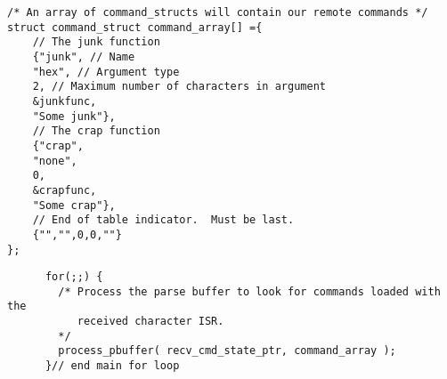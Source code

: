 \usepackage{listings}



\lstset{language=C}
\begin{lstlisting}[float, % Allows this listing to be a latex float
                   frame=single,
                   caption={Defining the command set with an array of
                            command structures.},
                   label=lst:cmdarray
                  ]
/* An array of command_structs will contain our remote commands */
struct command_struct command_array[] ={
    // The junk function
    {"junk", // Name
    "hex", // Argument type
    2, // Maximum number of characters in argument
    &junkfunc,
    "Some junk"},
    // The crap function
    {"crap",
    "none",
    0,
    &crapfunc,
    "Some crap"},
    // End of table indicator.  Must be last.
    {"","",0,0,""}
};
\end{lstlisting}

\begin{center}
  \begin{minipage}[c]{\textwidth - \tabcolsep}
    \begin{lstlisting}
      for(;;) {
        /* Process the parse buffer to look for commands loaded with the
           received character ISR. 
        */
        process_pbuffer( recv_cmd_state_ptr, command_array );
      }// end main for loop  
    \end{lstlisting}
  \end{minipage}
\end{center}
